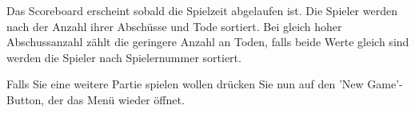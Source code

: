 \documentclass[a4paper]{article}
\begin{document}
Das Scoreboard erscheint sobald die Spielzeit abgelaufen ist. Die Spieler werden nach der Anzahl ihrer Abschüsse und Tode sortiert. Bei gleich hoher Abschussanzahl zählt die geringere Anzahl an Toden, falls beide Werte gleich sind werden die Spieler nach Spielernummer sortiert.

Falls Sie eine weitere Partie spielen wollen drücken Sie nun auf den 'New Game'-Button, der das Menü wieder öffnet.
\end{document}
